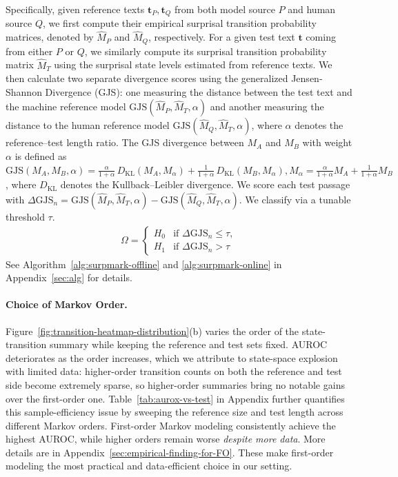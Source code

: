 \documentclass{article}
\theoremstyle{plain}
\theoremstyle{definition}
\theoremstyle{remark}
\begin{document}
Specifically, given reference texts $\mathbf{t}_P, \mathbf{t}_Q$  from both model source $P$ and human source $Q$, we first compute their empirical surprisal transition probability matrices, denoted by $\hat{M}_P$ and $\hat{M}_Q$, respectively. For a given test text $\mathbf{t}$ coming from either $P$ or $Q$, we similarly compute its surprisal transition probability matrix $\hat{M}_T$ using the surprisal state levels estimated from reference texts.  We then calculate two separate divergence scores using the generalized Jensen-Shannon Divergence (GJS): one measuring the distance between the test text and the machine reference model $ \text{GJS} ( \hat{M}_{P}, \hat{M}_{T}, \alpha )$ and another measuring the distance to the human reference model $ \text{GJS} ( \hat{M}_{Q}, \hat{M}_{T}, \alpha )$, where $\alpha$ denotes the reference–test length ratio. The GJS divergence between $M_A$ and $M_B$ with weight $\alpha$ is defined as 
$
\mathrm{GJS}(M_A,M_B,\alpha) =
\tfrac{\alpha}{1+\alpha}\, D_{\mathrm{KL}}(M_A, M_\alpha)
+ \tfrac{1}{1+\alpha}\, D_{\mathrm{KL}}(M_B , M_\alpha),
M_\alpha = \tfrac{\alpha}{1+\alpha} M_A + \tfrac{1}{1+\alpha} M_B$,
where $D_{\mathrm{KL}}$ denotes the Kullback–Leibler divergence.
We score each test passage with $\Delta\text{GJS}_n = \text{GJS} \left( \hat{M}_{P}, \hat{M}_{T}, \alpha \right) - \text{GJS} \left( \hat{M}_{Q}, \hat{M}_{T},\alpha \right)$. We classify via a tunable threshold $\tau$.
\begin{align}
    \Omega  = 
    \begin{cases} 
    H_0 & \text{if  }  \Delta\text{GJS}_n\leq \tau , \\
    H_1 & \text{if  }  \Delta\text{GJS}_n > \tau 
\end{cases} 
\end{align}
See Algorithm~\ref{alg:surpmark-offline} and \ref{alg:surpmark-online} in Appendix~\ref{sec:alg} for details.

\paragraph{Choice of Markov Order.}
Figure~\ref{fig:transition-heatmap-distribution}(b) varies the order of the state-transition summary while keeping the reference and test sets fixed. AUROC deteriorates as the order increases, which we attribute to state-space explosion with limited data: higher-order transition counts on both the reference and test side become extremely sparse, so higher-order summaries bring no notable gains over the first-order one. Table~\ref{tab:aurox-vs-test} in Appendix further quantifies this sample-efficiency issue by sweeping the reference size and test length across different Markov orders. First-order Markov modeling consistently achieve the highest AUROC, while higher orders remain worse \textit{despite more data}. More details are in Appendix~\ref{sec:empirical-finding-for-FO}. These make first-order modeling the most practical and data-efficient choice in our setting.
\end{document}
